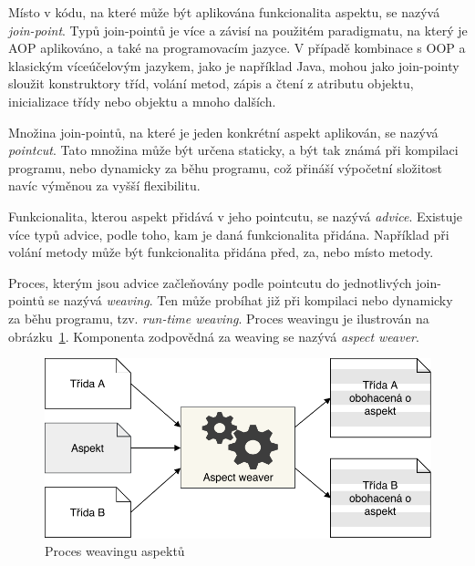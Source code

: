 Místo v kódu, na které může být aplikována funkcionalita aspektu, se nazývá
\textit{join-point}. Typů join-pointů je více a závisí na použitém paradigmatu,
na který je \gls{AOP} aplikováno, a také na programovacím jazyce. V případě
kombinace s \gls{OOP} a klasickým víceúčelovým jazykem, jako je například Java,
mohou jako join-pointy sloužit konstruktory tříd, volání metod, zápis a čtení
z atributu objektu, inicializace třídy nebo objektu a mnoho dalších.

Množina join-pointů, na které je jeden konkrétní aspekt aplikován, se nazývá \textit{pointcut}.
Tato množina může být určena staticky, a být tak známá při kompilaci programu, nebo
dynamicky za běhu programu, což přináší výpočetní složitost navíc výměnou
za vyšší flexibilitu.

Funkcionalita, kterou aspekt přidává v jeho pointcutu, se nazývá
\textit{advice}. Existuje více typů advice, podle toho, kam je
daná funkcionalita přidána. Například při volání metody může
být funkcionalita přidána před, za, nebo místo metody.

Proces, kterým jsou advice začleňovány podle pointcutu do
jednotlivých join-pointů se nazývá \textit{weaving}. Ten může
probíhat již při kompilaci nebo dynamicky za běhu programu,
tzv. \textit{run-time weaving}. Proces weavingu je ilustrován
na obrázku~\ref{fig:aspect-weaving}. Komponenta zodpovědná za
weaving se nazývá \textit{aspect weaver}.

\begin{figure}[t]
    \centering
    \includegraphics[keepaspectratio=true, width=0.7\linewidth]{figures/aspect-weaving.pdf}
    \caption{Proces weavingu aspektů}
    \label{fig:aspect-weaving}
\end{figure}

